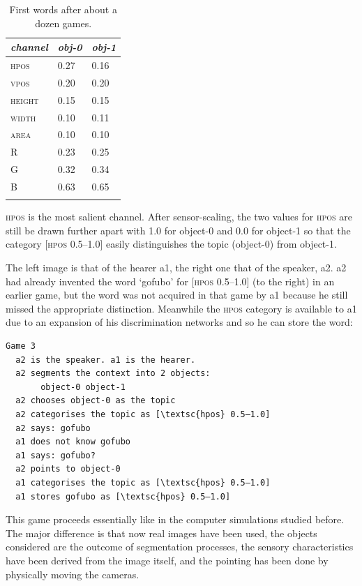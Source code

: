 \begin{table}[b]
\begin{center}
\begin{tabular}{lll}
\lsptoprule
{\itshape channel}& {\itshape obj-0} & {\itshape obj-1}\\ \midrule
\textsc{hpos} & 0.27 & 0.16\\ 
\textsc{vpos} & 0.20 & 0.20\\ 
\textsc{height} & 0.15 & 0.15\\ 
\textsc{width} & 0.10 & 0.11\\ 
\textsc{area} & 0.10 & 0.10\\ 
R & 0.23 & 0.25\\ 
G & 0.32 & 0.34\\ 
B & 0.63 & 0.65\\ 
\lspbottomrule
\end{tabular}
\caption{\label{tab:game3b}First words after about a dozen games.}
\end{center}
\end{table}
\clearpage
\textsc{hpos} is the most salient channel. After sensor-scaling, 
the two values for \textsc{hpos} are still be drawn further
apart with 1.0 for object-0 and 
0.0 for object-1 so that the category [\textsc{hpos} 0.5–1.0] easily 
distinguishes the topic (object-0) from object-1.

The left image is that of the hearer {\bfshape a1}, the right one
that of the speaker, {\bfshape a2}.
{\bfshape a2} had already invented the word `gofubo' for 
[\textsc{hpos} 0.5–1.0] (to the right) in an earlier game, 
but the word was not acquired in that game
by {\bfshape a1} because he still missed the 
appropriate distinction. Meanwhile the \textsc{hpos} category 
is available to {\bfshape a1} due to an
expansion of his discrimination networks
and so he can store the word: 
\begin{verbatim}
Game 3 
  a2 is the speaker. a1 is the hearer. 
  a2 segments the context into 2 objects: 
       object-0 object-1
  a2 chooses object-0 as the topic 
  a2 categorises the topic as [\textsc{hpos} 0.5–1.0]
  a2 says: gofubo
  a1 does not know gofubo
  a1 says: gofubo?
  a2 points to object-0
  a1 categorises the topic as [\textsc{hpos} 0.5–1.0]
  a1 stores gofubo as [\textsc{hpos} 0.5–1.0]
\end{verbatim}
This game proceeds essentially like in the computer
simulations studied before. The major difference is
that now real images have been used, the objects
considered are the outcome of segmentation processes,
the sensory characteristics have been derived from the 
image itself, and the pointing has been done by 
physically moving the cameras. 

